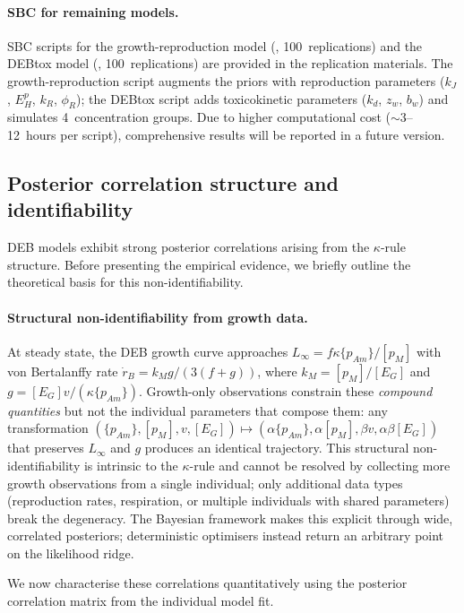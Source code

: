 \documentclass[article,shortnames]{jss}
\newcommand{\pAm}{\{p_{Am}\}}
\newcommand{\pM}{[p_M]}
\newcommand{\EG}{[E_G]}
\begin{document}
\paragraph{SBC for remaining models.}
SBC scripts for the growth-reproduction model
(, 100~replications) and the DEBtox
model (, 100~replications) are provided in
the replication materials.  The growth-reproduction script augments
the priors with reproduction parameters ($k_J$, $E_H^p$, $k_R$,
$\phi_R$); the DEBtox script adds toxicokinetic parameters
($k_d$, $z_w$, $b_w$) and simulates 4~concentration groups.
Due to higher computational cost ($\sim$3--12~hours per script),
comprehensive results will be reported in a future version.

\subsection{Posterior correlation structure and identifiability}
\label{sec:identifiability}

DEB models exhibit strong posterior correlations arising from the
$\kappa$-rule structure.  Before presenting the empirical evidence,
we briefly outline the theoretical basis for this non-identifiability.

\paragraph{Structural non-identifiability from growth data.}
At steady state, the DEB growth curve approaches
$L_\infty = f \kappa \pAm / \pM$ with von Bertalanffy rate
$\dot{r}_B = k_M g / (3(f + g))$, where $k_M = \pM / \EG$ and
$g = \EG v / (\kappa \pAm)$.  Growth-only observations constrain
these \emph{compound quantities} but not the individual parameters
that compose them: any transformation
$(\pAm, \pM, v, \EG) \mapsto (\alpha \pAm, \alpha \pM,
\beta v, \alpha \beta \EG)$ that preserves $L_\infty$ and $g$
produces an identical trajectory.  This structural
non-identifiability is intrinsic to the $\kappa$-rule and cannot be
resolved by collecting more growth observations from a single
individual; only additional data types (reproduction rates,
respiration, or multiple individuals with shared parameters) break
the degeneracy.  The Bayesian framework makes this explicit through
wide, correlated posteriors; deterministic optimisers instead return
an arbitrary point on the likelihood ridge.

We now characterise these correlations quantitatively using
the posterior correlation matrix from the individual model fit.
\end{document}
